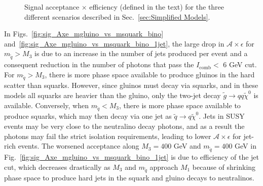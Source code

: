 \documentclass[dissertation.tex]{subfiles}
\begin{document}
\begin{figure}
	\caption{Signal acceptance $\times$ efficiency (defined in the text) for the three different scenarios described in Sec.~\ref{sec:Simplified Models}.}
	\label{fig:sig_Axe}
\end{figure}

In Figs.~\ref{fig:sig_Axe_mgluino_vs_msquark_bino} and~\ref{fig:sig_Axe_mgluino_vs_msquark_bino_1jet}, the large drop in $\mathcal{A}\times\epsilon$ for $m_{\tilde{q}} > M_{3}$ is due to an increase in the number of jets produced per event and a consequent reduction in the number of photons that pass the $I_{\mathrm{comb}} <$ 6 GeV cut.  For $m_{\tilde{q}} > M_{3}$, there is more phase space available to produce gluinos in the hard scatter than squarks.  However, since gluinos must decay via squarks, and in these models all squarks are heavier than the gluino, only the two-jet decay $\tilde{g}\rightarrow qq\tilde{\chi}^{0}$ is available.  Conversely, when $m_{\tilde{q}} < M_{3}$, there is more phase space available to produce squarks, which may then decay via one jet as $\tilde{q}\rightarrow q\tilde{\chi}^{0}$.  Jets in SUSY events may be very close to the neutralino decay photons, and as a result the photons may fail the strict isolation requirements, leading to lower $\mathcal{A}\times\epsilon$ for jet-rich events.  The worsened acceptance along $M_{3} = 400$ GeV and $m_{\tilde{q}} = 400$ GeV in Fig.~\ref{fig:sig_Axe_mgluino_vs_msquark_bino_1jet} is due to efficiency of the jet cut, which decreases drastically as $M_{3}$ and $m_{\tilde{q}}$ approach $M_{1}$ because of shrinking  phase space to produce hard jets in the squark and gluino decays to neutralinos.
\end{document}
